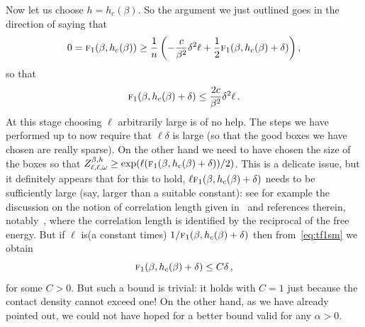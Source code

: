 \documentclass[10pt]{amsart}
\theoremstyle{definition}\newtheorem{defi}[theo]{Definition}\newtheorem{rema}[theo]{Remark}\newtheorem{exam}[theo]{Example}\newtheorem{exem}[theo]{Example}\newtheorem{nota}[theo]{Notation}
\newcommand{\gb}{\beta}
\newcommand{\gd}{\delta}
\newcommand{\go}{\omega}
\newcommand{\tf}{\textsc{f}} %
\begin{document}
Now let us choose $h=h_c(\gb)$. So the argument we just outlined goes in the direction of saying that
\begin{equation}
0 = \tf_1(\gb, h_c(\gb)) \ge \frac{1}{n} \left(-\frac{c}{\gb^2} \gd ^2 \ell+ \frac{1}{2} \tf_1(\gb, h_c(\gb)+ \gd) \right),
\end{equation}
so that
\begin{equation}
\tf_1(\gb, h_c(\gb)+ \gd)\le \frac{2c}{\gb^2} \gd ^2 \ell\,.\label{eq:tf1sm}
\end{equation}
At this stage choosing $\ell$ arbitrarily large is of no help. The steps we have performed up to now require that $ \ell \gd$ is large (so that the good boxes we have chosen are really sparse). On the other hand we need to have chosen the size of the boxes so that $Z_{\ell, \ell, \go}^{\gb, h} \ge \exp(\ell (\tf_1(\gb, h_c(\gb)+ \gd))/2)$. This is a delicate issue, but it definitely appears that for this to hold, $\ell \tf_1(\gb, h_c(\gb)+ \gd)$ needs to be sufficiently large (say, larger than a suitable constant): see for example the discussion on the notion of correlation length given in~\cite[Chapter~2]{cf:G} and references therein, notably~\cite{cf:GTalea}, where the correlation length is identified by the reciprocal of the free energy. But if $\ell$ is\linebreak(a constant times) $1/\tf_1(\gb, h_c(\gb)+ \gd)$ then from~\eqref{eq:tf1sm} we obtain
\begin{equation}\label{eq:trivb}
\tf_1(\gb, h_c(\gb)+ \gd)\le C \gd\,,
\end{equation}
for some $C>0$. But such a bound is trivial: it holds with $C=1$ just because the contact density cannot exceed one! On the other hand, as we have already pointed out, we could not have hoped for a better bound valid for any $\alpha>0$.
\end{document}
